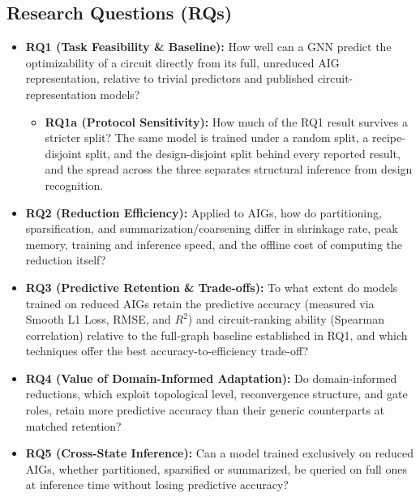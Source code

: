 \documentclass[paper=a4, fontsize=11pt]{scrartcl} %
\numberwithin{equation}{section} %
\numberwithin{figure}{section} %
\numberwithin{table}{section} %
\begin{document}
\subsection*{Research Questions (RQs)}
\begin{itemize}
    \item \textbf{RQ1 (Task Feasibility \& Baseline):} How well can a GNN predict the optimizability of a circuit directly from its full, unreduced AIG representation, relative to trivial predictors and published circuit-representation models?
    \begin{itemize}
        \item \textbf{RQ1a (Protocol Sensitivity):} How much of the RQ1 result survives a stricter split? The same model is trained under a random split, a recipe-disjoint split, and the design-disjoint split behind every reported result, and the spread across the three separates structural inference from design recognition.
    \end{itemize}

    \item \textbf{RQ2 (Reduction Efficiency):} Applied to AIGs, how do partitioning, sparsification, and summarization/coarsening differ in shrinkage rate, peak memory, training and inference speed, and the offline cost of computing the reduction itself?

    \item \textbf{RQ3 (Predictive Retention \& Trade-offs):} To what extent do models trained on reduced AIGs retain the predictive accuracy (measured via Smooth L1 Loss, RMSE, and $R^2$) and circuit-ranking ability (Spearman correlation) relative to the full-graph baseline established in RQ1, and which techniques offer the best accuracy-to-efficiency trade-off?

    \item \textbf{RQ4 (Value of Domain-Informed Adaptation):} Do domain-informed reductions, which exploit topological level, reconvergence structure, and gate roles, retain more predictive accuracy than their generic counterparts at matched retention?

    \item \textbf{RQ5 (Cross-State Inference):} Can a model trained exclusively on reduced AIGs, whether partitioned, sparsified or summarized, be queried on full ones at inference time without losing predictive accuracy?
\end{itemize}
\end{document}
